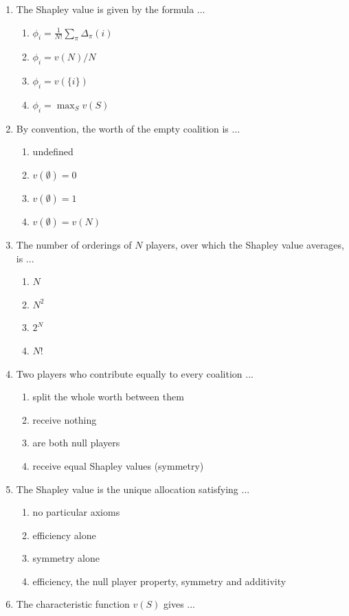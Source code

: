 \documentclass[11pt]{article}
\begin{document}
\begin{enumerate}[itemsep=6pt]
  \item The Shapley value is given by the formula ...
  \begin{enumerate}
    \item \(\phi_i = \frac{1}{N!} \sum_{\pi} \Delta_\pi(i)\)
    \item \(\phi_i = v(N) / N\)
    \item \(\phi_i = v(\{i\})\)
    \item \(\phi_i = \max_S v(S)\)
  \end{enumerate}
  \item By convention, the worth of the empty coalition is ...
  \begin{enumerate}
    \item undefined
    \item \(v(\emptyset) = 0\)
    \item \(v(\emptyset) = 1\)
    \item \(v(\emptyset) = v(N)\)
  \end{enumerate}
  \item The number of orderings of \(N\) players, over which the Shapley value averages, is ...
  \begin{enumerate}
    \item \(N\)
    \item \(N^2\)
    \item \(2^N\)
    \item \(N!\)
  \end{enumerate}
  \item Two players who contribute equally to every coalition ...
  \begin{enumerate}
    \item split the whole worth between them
    \item receive nothing
    \item are both null players
    \item receive equal Shapley values (symmetry)
  \end{enumerate}
  \item The Shapley value is the unique allocation satisfying ...
  \begin{enumerate}
    \item no particular axioms
    \item efficiency alone
    \item symmetry alone
    \item efficiency, the null player property, symmetry and additivity
  \end{enumerate}
  \item The characteristic function \(v(S)\) gives ...

\end{enumerate}
\end{document}

